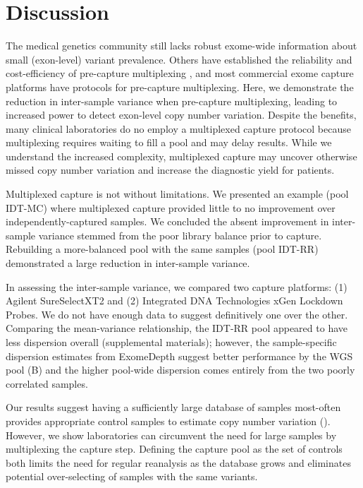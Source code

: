 \documentclass{article}\usepackage[]{graphicx}\usepackage[]{color}
\begin{document}

\section{Discussion}

The medical genetics community still lacks robust exome-wide information about small (exon-level) variant prevalence.
Others have established the reliability and cost-efficiency of pre-capture multiplexing \cite{ramos:2012aa,wesolowska:2011aa,shearer:2012aa,neiman:2012aa,rohland:2012aa}, and most commercial exome capture platforms have protocols for pre-capture multiplexing.
Here, we demonstrate the reduction in inter-sample variance when pre-capture multiplexing, leading to increased power to detect exon-level copy number variation.
Despite the benefits, many clinical laboratories do no employ a multiplexed capture protocol because multiplexing requires waiting to fill a pool and may delay results.
While we understand the increased complexity, multiplexed capture may uncover otherwise missed copy number variation and increase the diagnostic yield for patients.

Multiplexed capture is not without limitations.
We presented an example (pool IDT-MC) where multiplexed capture provided little to no improvement over independently-captured samples.
We concluded the absent improvement in inter-sample variance stemmed from the poor library balance prior to capture.
Rebuilding a more-balanced pool with the same samples (pool IDT-RR) demonstrated a large reduction in inter-sample variance.

In assessing the inter-sample variance, we compared two capture platforms: (1) Agilent SureSelectXT2 and (2) Integrated DNA Technologies xGen Lockdown Probes.
We do not have enough data to suggest definitively one over the other.
Comparing the mean-variance relationship, the IDT-RR pool appeared to have less dispersion overall (supplemental materials); however, the sample-specific dispersion estimates from ExomeDepth suggest better performance by the WGS pool (B) and the higher pool-wide dispersion comes entirely from the two poorly correlated samples.

Our results suggest having a sufficiently large database of samples most-often provides appropriate control samples to estimate copy number variation ().
However, we show laboratories can circumvent the need for large samples by multiplexing the capture step.
Defining the capture pool as the set of controls both limits the need for regular reanalysis as the database grows and eliminates potential over-selecting of samples with the same variants.
\end{document}
